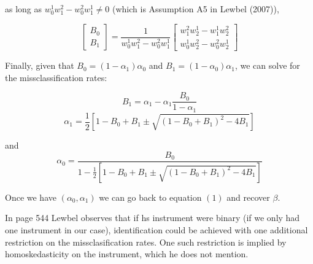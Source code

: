 as long as $w_{0}^{1}w_{1}^{2}-w_{0}^{2}w_{1}^{1}\neq0$ (which is
Assumption A5 in Lewbel (2007)),

\[
\left[\begin{array}{c}
B_{0}\\
B_{1}
\end{array}\right]=\frac{1}{w_{0}^{1}w_{1}^{2}-w_{0}^{2}w_{1}^{1}}\left[\begin{array}{c}
w_{1}^{2}w_{2}^{1}-w_{1}^{1}w_{2}^{2}\\
w_{0}^{1}w_{2}^{2}-w_{0}^{2}w_{2}^{1}
\end{array}\right]
\]


Finally, given that $B_{0}=(1-\alpha_{1})\alpha_{0}$ and $B_{1}=(1-\alpha_{0})\alpha_{1}$,
we can solve for the missclassification rates:

\[
B_{1}=\alpha_{1}-\alpha_{1}\frac{B_{0}}{1-\alpha_{1}}
\]
\[
\alpha_{1}=\frac{1}{2}\left[1-B_{0}+B_{1}\pm\sqrt{(1-B_{0}+B_{1})^{2}-4B_{1}}\right]
\]


and 
\[
\alpha_{0}=\frac{B_{0}}{1-\frac{1}{2}\left[1-B_{0}+B_{1}\pm\sqrt{(1-B_{0}+B_{1})^{2}-4B_{1}}\right]}
\]

Once we have $(\alpha_{0},\alpha_{1})$ we can go back to equation
$(1)$ and recover $\beta$.

In page 544 Lewbel observes that if hs instrument were binary (if
we only had one instrument in our case), identification could be achieved
with one additional restriction on the missclasification rates. One
such restriction is implied by homoskedasticity on the instrument,
which he does not mention. 
